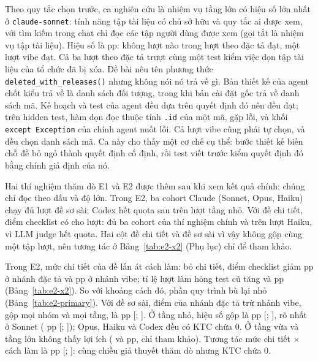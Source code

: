 \begin{table}[H]
\centering\small
\caption{Nguyên nhân thất bại: nhãn cuối của hai người gán; cột cuối là nhãn của Fable 5.2}
\label{tab:labels}

\end{table}

Theo quy tắc chọn trước, ca nghiên cứu là nhiệm vụ tầng lớn có hiệu số lớn nhất ở
\texttt{claude-sonnet}: tính năng tập tài liệu có chủ sở hữu và quy tắc ai được xem, với tìm kiếm trong chat chỉ
đọc các tập người dùng được xem (gọi tắt là nhiệm vụ tập tài liệu). Hiệu số là \NumResCaseDiffPp{} pp: không lượt nào trong \NumResCaseReps{} lượt theo đặc tả
đạt, một lượt vibe đạt. Cả ba lượt theo đặc tả trượt cùng một test kiểm việc dọn tập tài liệu của tổ chức đã bị
xóa. Đề bài nêu tên phương thức \texttt{deleted\_with\_releases()} nhưng không nói nó trả về gì. Bản thiết kế
của agent chốt kiểu trả về là danh sách đối tượng, trong khi bản cài đặt gốc trả về danh sách mã. Kế hoạch và
test của agent đều dựa trên quyết định đó nên đều đạt; trên hidden test, hàm dọn đọc thuộc tính \texttt{.id} của
một mã, gặp lỗi, và khối \texttt{except Exception} của chính agent nuốt lỗi. Cả \NumResCaseReps{} lượt vibe
cũng phải tự chọn, và đều chọn danh sách mã. Ca này cho thấy một cơ chế cụ thể: bước thiết kế biến chỗ đề bỏ
ngỏ thành quyết định cố định, rồi test viết trước kiểm quyết định đó bằng chính giả định của nó.

\label{sec:explore}Hai thí nghiệm thăm dò E1 và E2 được thêm sau khi xem kết quả chính; chúng chỉ đọc theo dấu và độ lớn. Trong E2,
ba cohort Claude (Sonnet, Opus, Haiku) chạy đủ \NumETwoClaudeBriefJudged{} lượt đề sơ sài; Codex hết quota sau
\NumETwoCodexSmallJudged{} trên \NumETwoCodexSmallExpected{} lượt tầng nhỏ. Với đề chi tiết, điểm checklist có
cho \NumETwoJudgeN{} lượt: đủ ba cohort của thí nghiệm chính và \NumETwoHaikuDetailedJudged{} trên
\NumETwoHaikuDetailedExpected{} lượt Haiku, vì LLM judge hết quota. Hai cột đề chi tiết và đề sơ sài vì vậy không
gộp cùng một tập lượt, nên tương tác ở Bảng~\ref{tab:e2-x2} (Phụ lục) chỉ để tham khảo.

Trong E2, mức chi tiết của đề lấn át cách làm: bỏ chi tiết, điểm checklist giảm
\NumETwoXScoreShiftSpec{} pp ở nhánh đặc tả và \NumETwoXScoreShiftVibe{} pp ở nhánh vibe; tỉ lệ lượt làm hỏng
test cũ tăng \NumETwoXRegressionShiftSpec{} và \NumETwoXRegressionShiftVibe{} pp (Bảng~\ref{tab:e2-x2}). So
với khoảng cách đó, phần quy trình bù lại nhỏ (Bảng~\ref{tab:e2-primary}). Với đề sơ sài, điểm của nhánh đặc
tả trừ nhánh vibe, gộp mọi nhóm và mọi tầng, là \NumETwoPooledAllPp{} pp [\NumETwoPooledAllLowPp{};
\NumETwoPooledAllHighPp{}]. Ở tầng nhỏ, hiệu số gộp là \NumETwoPooledSmallPp{} pp [\NumETwoPooledSmallLowPp{};
\NumETwoPooledSmallHighPp{}], rõ nhất ở Sonnet (\NumETwoSonnetSmallPp{} pp [\NumETwoSonnetSmallLowPp{};
\NumETwoSonnetSmallHighPp{}]); Opus, Haiku và Codex đều có KTC chứa 0. Ở tầng vừa và tầng lớn không thấy lợi
ích (\NumETwoPooledMediumRefPp{} và \NumETwoPooledLargeRefPp{} pp, chỉ tham khảo). Tương tác mức chi tiết
$\times$ cách làm là \NumETwoXScoreInter{} pp [\NumETwoXScoreInterLow{}; \NumETwoXScoreInterHigh{}]: cùng chiều
giả thuyết thăm dò nhưng KTC chứa 0.

